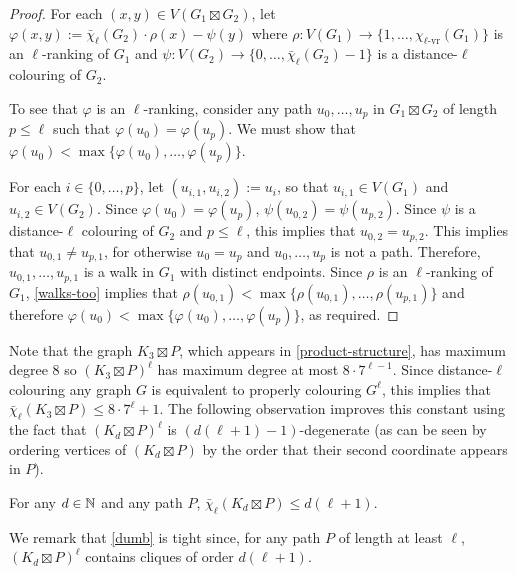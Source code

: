 \documentclass[kpfonts]{patmorin}
\newcommand{\rn}[1]{\chi_{\operatorname{#1-vr}}}
\newcommand{\lrn}{\rn{\ell}}
\newcommand{\dlcn}{\bar{\chi}_\ell}
\theoremstyle{named}
\begin{document}
\begin{proof}
    For each $(x,y)\in V(G_1\boxtimes G_2)$, let $\varphi(x,y):=\dlcn(G_2)\cdot \rho(x) - \psi(y)$ where $\rho:V(G_1)\to\{1,\ldots,\lrn(G_1)\}$ is an $\ell$-ranking of $G_1$ and $\psi:V(G_2)\to\{0,\ldots,\dlcn(G_2)-1\}$ is a distance-$\ell$ colouring of $G_2$.

    To see that $\varphi$ is an $\ell$-ranking, consider any
    path $u_0,\ldots,u_p$ in $G_1\boxtimes G_2$ of length $p\le\ell$ such that $\varphi(u_0)=\varphi(u_p)$.  We must show that $\varphi(u_0)<\max\{\varphi(u_0),\ldots,\varphi(u_p)\}$.

    For each $i\in\{0,\ldots,p\}$, let $(u_{i,1},u_{i,2}):=u_i$, so that $u_{i,1}\in V(G_1)$ and $u_{i,2}\in V(G_2)$. Since $\varphi(u_0)=\varphi(u_p)$, $\psi(u_{0,2})=\psi(u_{p,2})$. Since $\psi$ is a distance-$\ell$ colouring of $G_2$ and $p\le\ell$, this implies that $u_{0,2}=u_{p,2}$.  This implies that $u_{0,1}\neq u_{p,1}$, for otherwise $u_0=u_p$ and $u_0,\ldots,u_p$ is not a path.  Therefore, $u_{0,1},\ldots,u_{p,1}$ is a walk in $G_1$ with distinct endpoints.
    Since $\rho$ is an $\ell$-ranking of $G_1$, \cref{walks-too} implies that $\rho(u_{0,1})<\max\{\rho(u_{0,1}),\ldots,\rho(u_{p,1})\}$ and therefore $\varphi(u_0)<\max\{\varphi(u_0),\ldots,\varphi(u_p)\}$, as required.
\end{proof}

Note that the graph $K_3\boxtimes P$, which appears in \cref{product-structure}, has maximum degree 8 so $(K_3\boxtimes P)^\ell$ has maximum degree at most $8\cdot 7^{\ell-1}$.  Since distance-$\ell$ colouring any graph $G$ is equivalent to properly colouring $G^{\ell}$, this implies that $\dlcn(K_3\boxtimes P)\le 8\cdot7^\ell+1$. The following observation improves this constant using the fact that $(K_d\boxtimes P)^\ell$ is $(d(\ell+1)-1)$-degenerate (as can be seen by ordering vertices of $(K_d\boxtimes P)$ by the order that their second coordinate appears in $P$).

\begin{obs}\label{dumb}
    For any $d\in\mathbb{N}$ and any path $P$, $\dlcn(K_d\boxtimes P)\le d(\ell+1)$.
\end{obs}

We remark that \cref{dumb} is tight since, for any path $P$ of length at least $\ell$, $(K_d\boxtimes P)^\ell$ contains cliques of order $d(\ell+1)$.

%
\end{document}
